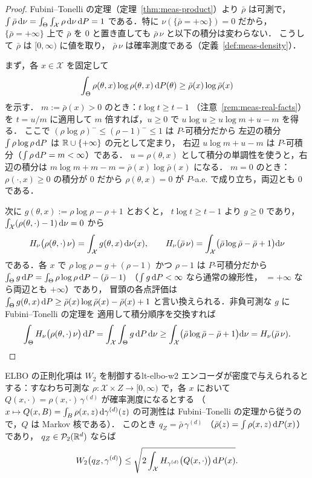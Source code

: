 \begin{proof}
  Fubini--Tonelli の定理（定理~\ref{thm:meas-product}）より
  $\bar\rho$ は可測で，
  $\int\bar\rho\,\mathrm{d}\nu=\int_\Theta\int_{\mathcal{X}}\rho\,\mathrm{d}\nu\,\mathrm{d} P=1$
  である．特に $\nu(\{\bar\rho=+\infty\})=0$ だから，
  $\{\bar\rho=+\infty\}$ 上で $\bar\rho$ を $0$ と置き直しても
  $\bar\rho\,\nu$ と以下の積分は変わらない．
  こうして $\bar\rho$ は $[0,\infty)$ に値を取り，
  $\bar\rho\,\nu$ は確率測度である（定義~\ref{def:meas-density}）．

  まず，各 $x\in\mathcal{X}$ を固定して
  \[
    \int_\Theta\rho(\theta,x)\log\rho(\theta,x)\,\mathrm{d} P(\theta)
    \geq\bar\rho(x)\log\bar\rho(x)
  \]
  を示す．
  $m:=\bar\rho(x)>0$ のとき：$t\log t\geq t-1$
  （注意~\ref{rem:meas-real-facts}）を $t=u/m$ に適用して
  $m$ 倍すれば，$u\geq0$ で
  $u\log u\geq u\log m+u-m$ を得る．
  ここで $(\rho\log\rho)^-\leq(\rho-1)^-\leq1$ は $P$-可積分だから
  左辺の積分 $\int\rho\log\rho\,\mathrm{d} P$ は
  $\mathbb{R}\cup\{+\infty\}$ の元として定まり，
  右辺 $u\log m+u-m$ は $P$-可積分（$\int\rho\,\mathrm{d} P=m<\infty$）である．
  $u=\rho(\theta,x)$ として積分の単調性を使うと，右辺の積分は
  $m\log m+m-m=\bar\rho(x)\log\bar\rho(x)$ になる．
  $m=0$ のとき：$\rho(\cdot,x)\geq0$ の積分が $0$ だから
  $\rho(\theta,x)=0$ が $P$-a.e. で成り立ち，両辺とも $0$ である．

  次に $g(\theta,x):=\rho\log\rho-\rho+1$ とおくと，
  $t\log t\geq t-1$ より $g\geq0$ であり，
  $\int_{\mathcal{X}}(\rho(\theta,\cdot)-1)\,\mathrm{d}\nu=0$ から
  \[
    H_\nu\bigl(\rho(\theta,\cdot)\,\nu\bigr)
    =\int_{\mathcal{X}}g(\theta,x)\,\mathrm{d}\nu(x),
    \qquad
    H_\nu(\bar\rho\,\nu)
    =\int_{\mathcal{X}}\bigl(\bar\rho\log\bar\rho-\bar\rho+1\bigr)\mathrm{d}\nu
  \]
  である．各 $x$ で $\rho\log\rho=g+(\rho-1)$ かつ
  $\rho-1$ は $P$-可積分だから
  $\int_\Theta g\,\mathrm{d} P=\int_\Theta\rho\log\rho\,\mathrm{d} P
  -(\bar\rho-1)$
  （$\int g\,\mathrm{d} P<\infty$ なら通常の線形性，
  $=+\infty$ なら両辺とも $+\infty$）であり，
  冒頭の各点評価は
  $\int_\Theta g(\theta,x)\,\mathrm{d} P
  \geq\bar\rho(x)\log\bar\rho(x)-\bar\rho(x)+1$
  と言い換えられる．非負可測な $g$ に Fubini--Tonelli の定理を
  適用して積分順序を交換すれば
  \[
    \int_\Theta H_\nu\bigl(\rho(\theta,\cdot)\,\nu\bigr)\,\mathrm{d} P
    =\int_{\mathcal{X}}\int_\Theta g\,\mathrm{d} P\,\mathrm{d}\nu
    \geq\int_{\mathcal{X}}\bigl(\bar\rho\log\bar\rho-\bar\rho+1\bigr)\mathrm{d}\nu
    =H_\nu(\bar\rho\,\nu).  \qedhere
  \]
\end{proof}

\begin{corollary}{ELBO の正則化項は $W_2$ を制御する}{lt-elbo-w2}
  エンコーダが密度で与えられるとする：すなわち可測な
  $\rho\colon\mathcal{X}\times Z\to[0,\infty)$ で，各 $x$ において
  $Q(x,\cdot)=\rho(x,\cdot)\,\gamma^{(d)}$ が確率測度になるとする
  （$x\mapsto Q(x,B)=\int_B\rho(x,z)\,\mathrm{d}\gamma^{(d)}(z)$ の可測性は
  Fubini--Tonelli の定理から従うので，$Q$ は Markov 核である）．
  このとき $q_Z=\bar\rho\,\gamma^{(d)}$
  （$\bar\rho(z)=\int\rho(x,z)\,\mathrm{d} P(x)$）であり，
  $q_Z\in\mathcal{P}_{2}(\mathbb{R}^d)$ ならば
  \[
    W_2\bigl(q_Z,\gamma^{(d)}\bigr)
    \leq\sqrt{2\int_{\mathcal{X}}
    H_{\gamma^{(d)}}\bigl(Q(x,\cdot)\bigr)\,\mathrm{d} P(x)}.
  \]
\end{corollary}

